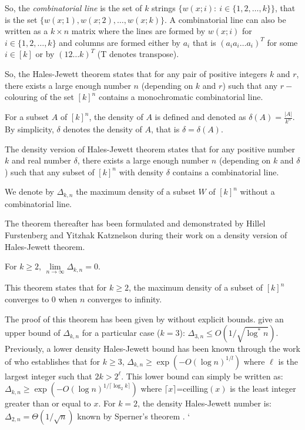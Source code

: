So, the \textit{combinatorial line} is the set of $k$ strings $\{w(x;i): \ i\in \{1,2,\ldots,k\} \}$, that is the set $\{w(x;1), w(x;2), \ldots, w(x;k)\}.$ A combinatorial line can also be written as a $k\times n$ matrix where the lines are formed by $w(x;i)$ for $i \in \{1,2,\ldots,k \}$ and columns are formed either  by $a_i$ that is $(a_ia_i\ldots a_i)^T$  for some $i \in [k]$ or by $(12\ldots k)^T$ (T denotes  transpose).
 
So, the Hales-Jewett theorem states that for any pair of positive integers $k$ and $r$, there exists a large enough number $n$ (depending on $k$ and $r$) such that  any $r-$colouring of the set  $[k]^n $ contains a monochromatic combinatorial line.

For a subset $A$ of $[k]^n$, the density of $A$ is defined and denoted as $\delta(A)=\frac{|A|}{k^n}.$ By simplicity, $\delta$ denotes the density of $A$, that is $\delta=\delta(A).$

The density version of Hales-Jewett theorem states that for any positive number $k$ and real number $\delta$,  there exists a large enough number $n$ (depending on $k$ and $\delta$) such that  any subset of  $[k]^n $ with density $\delta$ contains a combinatorial line.

We denote by $\Delta_{k,n}$ the maximum density of a subset $W$ of $[k]^n$ without a combinatorial line. 

The theorem thereafter has been formulated and demonstrated  by Hillel Furstenberg and Yitzhak Katznelson  during their work on a density version of Hales-Jewett theorem. 

\begin{thm}	For $k\geq 2$, $\lim\limits_{n\longrightarrow \infty} \Delta_{k,n}=0.$ \label{fk}	\end{thm}
 
This theorem states that for $k\geq 2$, the maximum  density of a subset of $[k]^n$ converges to $0$ when $n$ converges to infinity.

The proof of this theorem has been given by \cite{furstenberg1991density} without explicit bounds. \cite{polymath2012new} give an upper bound of $\Delta_{k,n}$ for a particular case ($k=3$): $\Delta_{3,n} \leq O(1/\sqrt{\log^* n}).$ Previously, a lower  density Hales-Jewett bound  has been known through the work of \cite{polymath2010density} who establishes that  for $k\geq 3$, $\Delta_{k,n} \geq \exp \left(-O(\log n)^{1/l}\right)$ where $\ell$ is the largest integer such that $2k > 2^{\ell}$. This lower bound can simply be written as: $\Delta_{k,n} \geq \exp \left(-O(\log n)^{1/\lceil \log_2 k \rceil}\right)$ where $\lceil x \rceil$=ceilling$(x)$ is the least integer greater than or equal to $x.$ For $k=2$, the density Hales-Jewett number is: $\Delta_{2,n}=\Theta(1/\sqrt{n})$ known by Sperner's theorem \citep{hkazla2016forbidden}.
`

